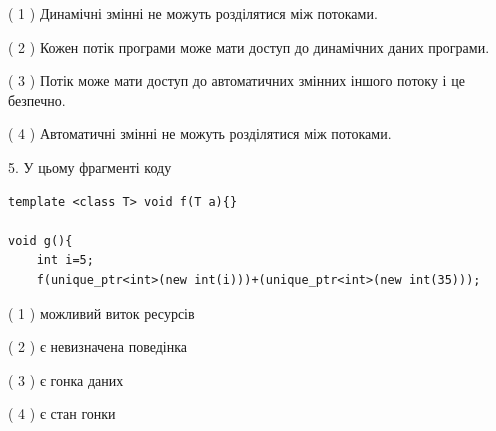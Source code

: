 \documentclass[12pt, ukrainian]{article}
\begin{document}
\begin {large}
{( 1 ) Динамічні змінні не можуть розділятися між потоками.%

( 2 ) Кожен потік програми може мати доступ до динамічних даних програми.%

( 3 ) Потік може мати доступ до автоматичних змінних іншого потоку і це безпечно.%

( 4 ) Автоматичні змінні не можуть розділятися між потоками.%


5. У цьому фрагменті коду
\begin{verbatim}
template <class T> void f(T a){}

void g(){
    int i=5;
    f(unique_ptr<int>(new int(i)))+(unique_ptr<int>(new int(35)));
\end{verbatim}
( 1 ) можливий виток ресурсів%

( 2 ) є невизначена поведінка%

( 3 ) є гонка даних%

( 4 ) є стан гонки%
}
\end {large}
\end{document}
